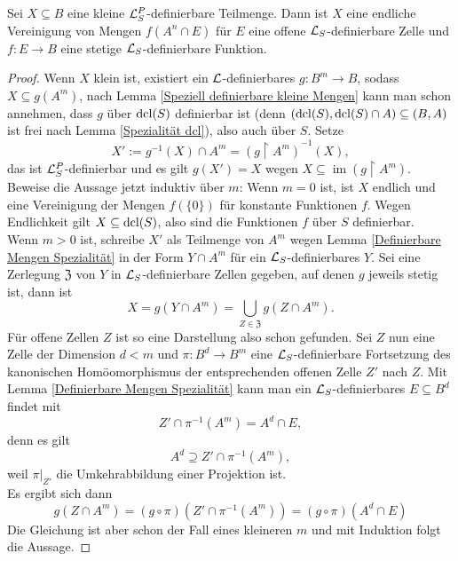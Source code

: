\begin{lemma}
	Sei $X\subseteq B$ eine kleine $\mathcal{L}^P_S$-definierbare Teilmenge. Dann ist $X$ eine endliche Vereinigung von Mengen $f(A^n\cap E)$ für $E$ eine offene $\mathcal{L}_S$-definierbare Zelle und $f:E\rightarrow B$ eine stetige $\mathcal{L}_S$-definierbare Funktion.
\end{lemma}
\begin{proof}
	Wenn $X$ klein ist, existiert ein $\mathcal{L}$-definierbares $g:B^m\rightarrow B$, sodass $X\subseteq g(A^m)$, nach Lemma \ref{Speziell definierbare kleine Mengen} kann man schon annehmen, dass $g$ über $\operatorname{dcl}(S)$ definierbar ist (denn $(\operatorname{dcl}(S),\operatorname{dcl}(S)\cap A)\subseteq (B,A)$ ist frei nach Lemma \ref{Spezialität dcl}), also auch über $S$. Setze $$X':=g^{-1}(X)\cap A^m=(g\upharpoonright A^m)^{-1}(X),$$ das ist $\mathcal{L}^P_S$-definierbar und es gilt $g(X')=X$ wegen $X\subseteq\operatorname{im}(g\upharpoonright A^m)$.\\
	Beweise die Aussage jetzt induktiv über $m$: Wenn $m=0$ ist, ist $X$ endlich und eine Vereinigung der Mengen $f(\{0\})$ für konstante Funktionen $f$. Wegen Endlichkeit gilt $X\subseteq\operatorname{dcl}(S)$, also sind die Funktionen $f$ über $S$ definierbar.\\
	Wenn $m>0$ ist, schreibe $X'$ als Teilmenge von $A^m$ wegen Lemma \ref{Definierbare Mengen Spezialität} in der Form $Y\cap A^m$ für ein $\mathcal{L}_S$-definierbares $Y$. Sei eine Zerlegung $\mathfrak{Z}$ von $Y$ in $\mathcal{L}_S$-definierbare Zellen gegeben, auf denen $g$ jeweils stetig ist, dann ist $$X=g(Y\cap A^m)=\bigcup\limits_{Z\in\mathfrak{Z}}g(Z\cap A^m).$$
	Für offene Zellen $Z$ ist so eine Darstellung also schon gefunden. Sei $Z$ nun eine Zelle der Dimension $d<m$ und $\pi:B^d\rightarrow B^m$ eine $\mathcal{L}_S$-definierbare Fortsetzung des kanonischen Homöomorphismus der entsprechenden offenen Zelle $Z'$ nach $Z$. Mit Lemma \ref{Definierbare Mengen Spezialität} kann man ein $\mathcal{L}_S$-definierbares $E\subseteq B^d$ findet mit $$Z'\cap\pi^{-1}(A^m)=A^d\cap E,$$ denn es gilt $$A^d\supseteq Z'\cap\pi^{-1}(A^m),$$ weil $\pi|_{Z'}$ die Umkehrabbildung einer Projektion ist.\\
	Es ergibt sich dann
	$$g(Z\cap A^m)=(g\circ\pi)(Z'\cap\pi^{-1}(A^m))=(g\circ\pi)(A^d\cap E)$$
	Die Gleichung ist aber schon der Fall eines kleineren $m$ und mit Induktion folgt die Aussage.
\end{proof}

